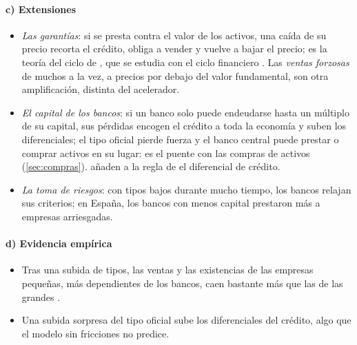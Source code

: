 \documentclass[11pt]{article}
\begin{document}
\paragraph{c) Extensiones}
\begin{itemize}
\item \emph{Las garantías}: si se presta contra el valor de los activos, una caída de su precio recorta el crédito, obliga a vender y vuelve a bajar el precio; es la teoría del ciclo de \textcite{KiyotakiMoore1997Credit}, que se estudia con el ciclo financiero . Las \emph{ventas forzosas} de muchos a la vez, a precios por debajo del valor fundamental, son otra amplificación, distinta del acelerador\nocite{ShleiferVishny2011Fire}.
\item \emph{El capital de los bancos}: si un banco solo puede endeudarse hasta un múltiplo de su capital, sus pérdidas encogen el crédito a toda la economía y suben los diferenciales; el tipo oficial pierde fuerza y el banco central puede prestar o comprar activos en su lugar\nocite{GertlerKiyotaki2010Financial,GertlerKaradi2011Unconventional}: es el puente con las compras de activos (\ref{sec:compras}). \textcite{CurdiaWoodford2010Credit} añaden a la regla de  el diferencial de crédito.
\item \emph{La toma de riesgos}: con tipos bajos durante mucho tiempo, los bancos relajan sus criterios\nocite{BorioZhu2012Capital}; en España, los bancos con menos capital prestaron más a empresas arriesgadas\nocite{JimenezEtAl2014Hazardous}.
\end{itemize}

\begin{infografia}[H]
\centering
\caption{El acelerador financiero: la espiral entre el ciclo financiero y el real}\label{figu:acelerador-financiero}
\end{infografia}

\paragraph{d) Evidencia empírica}
\begin{itemize}
\item Tras una subida de tipos, las ventas y las existencias de las empresas pequeñas, más dependientes de los bancos, caen bastante más que las de las grandes\nocite{GertlerGilchrist1994Monetary} .
\item Una subida sorpresa del tipo oficial sube los diferenciales del crédito, algo que el modelo sin fricciones no predice\nocite{GertlerKaradi2015}.
\end{itemize}
\end{document}
